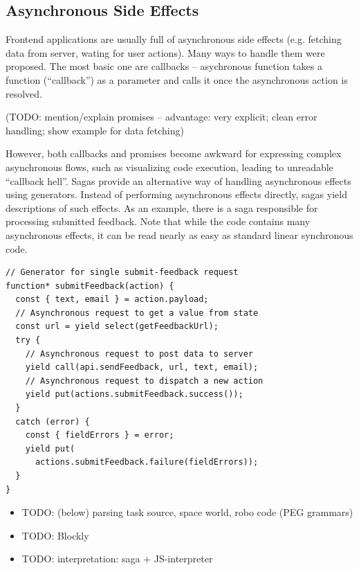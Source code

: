 \subsection{Asynchronous Side Effects}

Frontend applications are usually full of asynchronous side effects
(e.g. fetching data from server, wating for user actions).
Many ways to handle them were proposed.
The most basic one are callbacks --
asychronous function takes a function (``callback'') as a parameter
and calls it once the asynchronous action is resolved.

(TODO: mention/explain promises -- advantage: very explicit; clean error
handling; show example for data fetching)

However, both callbacks and promises become awkward for expressing complex
asynchronous flows, such as visualizing code execution,
leading to unreadable ``callback hell''. %
Sagas provide an alternative way of handling asynchronous effects using generators.
Instead of performing asynchronous effects directly, sagas yield
descriptions of such effects.
As an example, there is a saga responsible for processing
submitted feedback.
Note that while the code contains many asynchronous effects,
it can be read nearly as easy as standard linear synchronous code.


\begin{lstlisting}[language=ES6]
// Generator for single submit-feedback request
function* submitFeedback(action) {
  const { text, email } = action.payload;
  // Asynchronous request to get a value from state
  const url = yield select(getFeedbackUrl);
  try {
    // Asynchronous request to post data to server
    yield call(api.sendFeedback, url, text, email);
    // Asynchronous request to dispatch a new action
    yield put(actions.submitFeedback.success());
  }
  catch (error) {
    const { fieldErrors } = error;
    yield put(
      actions.submitFeedback.failure(fieldErrors));
  }
}
\end{lstlisting}



\begin{itemize}
\item TODO: (below) parsing task source, space world, robo code (PEG grammars)
\item TODO: Blockly
\item TODO: interpretation: saga + JS-interpreter
\end{itemize}

